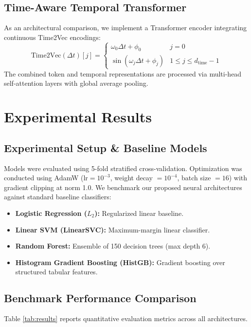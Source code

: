 \documentclass[runningheads]{llncs}
\begin{document}
\subsection{Time-Aware Temporal Transformer}
As an architectural comparison, we implement a Transformer encoder integrating continuous Time2Vec encodings:
\[
\text{Time2Vec}(\Delta t)[j] = \begin{cases} 
\omega_0 \Delta t + \phi_0 & j = 0 \\
\sin(\omega_j \Delta t + \phi_j) & 1 \le j \le d_{\text{time}} - 1
\end{cases}
\]
The combined token and temporal representations are processed via multi-head self-attention layers with global average pooling.

\section{Experimental Results}
\label{sec:results}

\subsection{Experimental Setup \& Baseline Models}
Models were evaluated using 5-fold stratified cross-validation. Optimization was conducted using AdamW ($\text{lr} = 10^{-3}$, weight decay $= 10^{-4}$, batch size $= 16$) with gradient clipping at norm 1.0. We benchmark our proposed neural architectures against standard baseline classifiers:
\begin{itemize}
    \item \textbf{Logistic Regression ($L_2$):} Regularized linear baseline.
    \item \textbf{Linear SVM (LinearSVC):} Maximum-margin linear classifier.
    \item \textbf{Random Forest:} Ensemble of 150 decision trees (max depth 6).
    \item \textbf{Histogram Gradient Boosting (HistGB):} Gradient boosting over structured tabular features.
\end{itemize}

\subsection{Benchmark Performance Comparison}
Table \ref{tab:results} reports quantitative evaluation metrics across all architectures.
\end{document}
